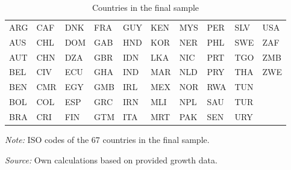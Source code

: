 \begin{table}[!htbp]
\centering
\caption{Countries in the final sample}
\label{tab:countries}
\begin{threeparttable}
\begin{tabular}{llllllllll}
\toprule
ARG & CAF & DNK & FRA & GUY & KEN & MYS & PER & SLV & USA \\
AUS & CHL & DOM & GAB & HND & KOR & NER & PHL & SWE & ZAF \\
AUT & CHN & DZA & GBR & IDN & LKA & NIC & PRT & TGO & ZMB \\
BEL & CIV & ECU & GHA & IND & MAR & NLD & PRY & THA & ZWE \\
BEN & CMR & EGY & GMB & IRL & MEX & NOR & RWA & TUN &  \\
BOL & COL & ESP & GRC & IRN & MLI & NPL & SAU & TUR &  \\
BRA & CRI & FIN & GTM & ITA & MRT & PAK & SEN & URY &  \\
\bottomrule
\end{tabular}
\begin{tablenotes}[flushleft]
\footnotesize
\item \textit{Note:} ISO codes of the 67 countries in the final sample.
\item \textit{Source:} Own calculations based on provided growth data.
\end{tablenotes}
\end{threeparttable}
\end{table}